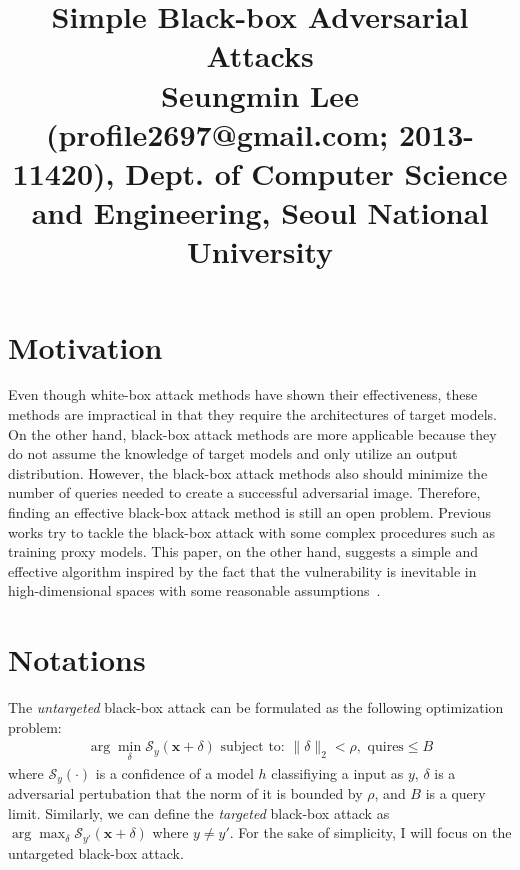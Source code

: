 \documentclass[10pt,twocolumn,letterpaper]{article}
\begin{document}
\title{Simple Black-box Adversarial Attacks
	 \\ {\rm {\normalsize Seungmin Lee (profile2697@gmail.com; 2013-11420), Dept. of Computer Science and Engineering, Seoul National University}}} 

\maketitle
\thispagestyle{empty}


\section{Motivation}
Even though white-box attack methods have shown their effectiveness, these methods are impractical in that they require the architectures of target models. On the other hand, black-box attack methods are more applicable because they do not assume the knowledge of target models and only utilize an output distribution. However, the black-box attack methods also should minimize the number of queries needed to create a successful adversarial image. Therefore, finding an effective black-box attack method is still an open problem. Previous works try to tackle the black-box attack with some complex procedures such as training proxy models. This paper, on the other hand, suggests a simple and effective algorithm inspired by the fact that the vulnerability is inevitable in high-dimensional spaces with some reasonable assumptions~\cite{Inevit1, Inevit2}.

\section{Notations}
The \textit{untargeted} black-box attack can be formulated as the following optimization problem:
\begin{align}\label{eq}
\arg\min_{\delta} \mathcal{S}_y(\mathbf{x} + \delta) \text{  subject to:  } \|\delta\|_2 < \rho, \text{ quires} \leq B
\end{align}
where $\mathcal{S}_y(\cdot)$ is a confidence of a model $h$ classifiying a input as $y$, $\delta$ is a adversarial pertubation that the norm of it is bounded by $\rho$, and $B$ is a query limit. Similarly, we can define the \textit{targeted} black-box attack as $\arg\max_{\delta} \mathcal{S}_{y'}(\mathbf{x} + \delta)$ where $y \neq y'$. For the sake of simplicity, I will focus on the untargeted black-box attack.
\end{document}
